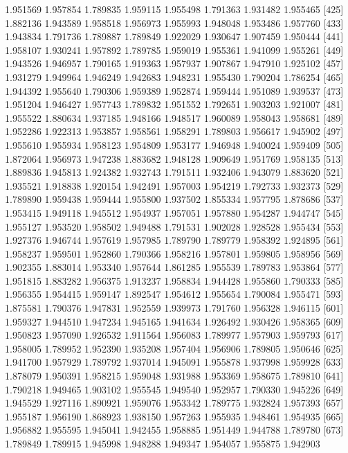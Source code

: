 \documentclass{article}
\begin{document}
\begin{Schunk}
\begin{Soutput}
 [417] 1.951569 1.957854 1.789835 1.959115 1.955498 1.791363 1.931482 1.955465
 [425] 1.882136 1.943589 1.958518 1.956973 1.955993 1.948048 1.953486 1.957760
 [433] 1.943834 1.791736 1.789887 1.789849 1.922029 1.930647 1.907459 1.950444
 [441] 1.958107 1.930241 1.957892 1.789785 1.959019 1.955361 1.941099 1.955261
 [449] 1.943526 1.946957 1.790165 1.919363 1.957937 1.907867 1.947910 1.925102
 [457] 1.931279 1.949964 1.946249 1.942683 1.948231 1.955430 1.790204 1.786254
 [465] 1.944392 1.955640 1.790306 1.959389 1.952874 1.959444 1.951089 1.939537
 [473] 1.951204 1.946427 1.957743 1.789832 1.951552 1.792651 1.903203 1.921007
 [481] 1.955522 1.880634 1.937185 1.948166 1.948517 1.960089 1.958043 1.958681
 [489] 1.952286 1.922313 1.953857 1.958561 1.958291 1.789803 1.956617 1.945902
 [497] 1.955610 1.955934 1.958123 1.954809 1.953177 1.946948 1.940024 1.959409
 [505] 1.872064 1.956973 1.947238 1.883682 1.948128 1.909649 1.951769 1.958135
 [513] 1.889836 1.945813 1.924382 1.932743 1.791511 1.932406 1.943079 1.883620
 [521] 1.935521 1.918838 1.920154 1.942491 1.957003 1.954219 1.792733 1.932373
 [529] 1.789890 1.959438 1.959444 1.955800 1.937502 1.855334 1.957795 1.878686
 [537] 1.953415 1.949118 1.945512 1.954937 1.957051 1.957880 1.954287 1.944747
 [545] 1.955127 1.953520 1.958502 1.949488 1.791531 1.902028 1.928528 1.955434
 [553] 1.927376 1.946744 1.957619 1.957985 1.789790 1.789779 1.958392 1.924895
 [561] 1.958237 1.959501 1.952860 1.790366 1.958216 1.957801 1.959805 1.958956
 [569] 1.902355 1.883014 1.953340 1.957644 1.861285 1.955539 1.789783 1.953864
 [577] 1.951815 1.883282 1.956375 1.913237 1.958834 1.944428 1.955860 1.790333
 [585] 1.956355 1.954415 1.959147 1.892547 1.954612 1.955654 1.790084 1.955471
 [593] 1.875581 1.790376 1.947831 1.952559 1.939973 1.791760 1.956328 1.946115
 [601] 1.959327 1.944510 1.947234 1.945165 1.941634 1.926492 1.930426 1.958365
 [609] 1.950823 1.957090 1.926532 1.911564 1.956083 1.789977 1.957903 1.959793
 [617] 1.958005 1.789952 1.952390 1.935208 1.957404 1.956906 1.789805 1.950646
 [625] 1.941700 1.957929 1.789792 1.937014 1.945091 1.955878 1.937998 1.959928
 [633] 1.878079 1.950391 1.958215 1.959048 1.931988 1.953369 1.958675 1.789810
 [641] 1.790218 1.949465 1.903102 1.955545 1.949540 1.952957 1.790330 1.945226
 [649] 1.945529 1.927116 1.890921 1.959076 1.953342 1.789775 1.932824 1.957393
 [657] 1.955187 1.956190 1.868923 1.938150 1.957263 1.955935 1.948461 1.954935
 [665] 1.956882 1.955595 1.945041 1.942455 1.958885 1.951449 1.944788 1.789780
 [673] 1.789849 1.789915 1.945998 1.948288 1.949347 1.954057 1.955875 1.942903

\end{Soutput}
\end{Schunk}
\end{document}
